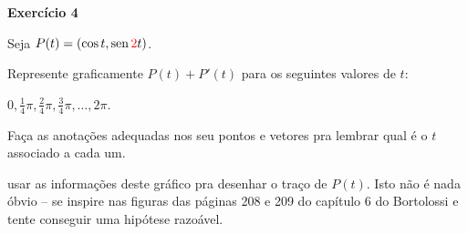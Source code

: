 \documentclass[oneside,12pt]{article}
\begin{document}
{\bf Exercício 4}

Seja $P(t) = (\cos t, \sen \ColorRed{2}t)$.

Represente graficamente $P(t)+P'(t)$ para os seguintes valores de $t$:

$0, \frac14π, \frac24π, \frac34π, \ldots, 2π$.

Faça as anotações adequadas nos seu pontos e vetores pra lembrar qual
é o $t$ associado a cada um.

\msk

 usar as informações deste gráfico pra desenhar o
traço de $P(t)$. Isto não é nada óbvio -- se inspire nas figuras das
páginas 208 e 209 do capítulo 6 do Bortolossi e tente conseguir uma
hipótese razoável.

\msk







\end{document}
